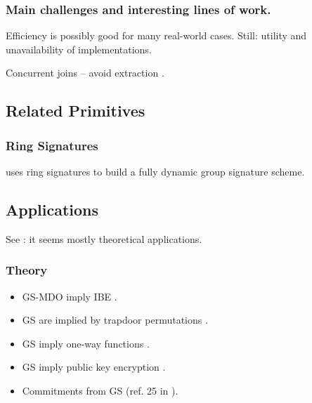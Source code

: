\subsubsection{Main challenges and interesting lines of work.}


Efficiency is possibly good for many real-world cases. Still: utility
and unavailability of implementations.

Concurrent joins -- avoid extraction \cite{ky05,klap20}.

\subsection{Related Primitives}


\subsubsection{Ring Signatures}
\label{sssec:rs}

\cite{rst06}

\cite{bcc+15} uses ring signatures to build a fully dynamic group signature
scheme.

\subsection{Applications}
\label{ssec:gsapplication}


See \cite[Section 1.2.3]{bsi12}: it seems mostly theoretical applications.

\subsubsection{Theory}
\label{sssec:gstheoryapp}


\begin{itemize}
\item GS-MDO imply IBE \cite{ehk+19}.
\item GS are implied by trapdoor permutations \cite{bmw03}.
\item GS imply one-way functions \cite{romp90}.
\item GS imply public key encryption \cite{aw04}.
\item Commitments from GS (ref. 25 in \cite{bfg+11}).
\end{itemize}


